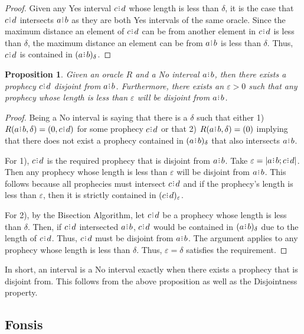 \documentclass[12pt]{article}
\newtheorem{proposition}{Proposition}[section]
\begin{document}
\begin{proof}
    Given any Yes interval $c\rint d$ whose length is less than $\delta$, it is the case that $c\rint d$ intersects $a\rint b$ as they are both Yes intervals of the same oracle. Since the maximum distance an element of $c\rint d$ can be from another element in $c\rint d$ is less than $\delta$, the maximum distance an element can be from $a\rint b$ is less than $\delta$. Thus, $c\rint d$ is contained in $\halo{a\rint b}$.
\end{proof}

\begin{proposition}\label{os-no-disjoint}
    Given an oracle $R$ and a No interval $a\rint b$, then there exists a prophecy $c\rint d$ disjoint from $a\rint b$. Furthermore, there exists an $\varepsilon > 0$ such that any prophecy whose length is less than $\varepsilon$ will be disjoint from $a\rint b$.
\end{proposition}

\begin{proof}
    Being a No interval is saying that there is a $\delta$ such that either 1) $R(a\rint b, \delta) = (0, c\rint d)$ for some prophecy $c\rint d$ or that 2) $R(a\rint b, \delta) = (0)$ implying that there does not exist a prophecy contained in $\halo{a\rint b}$ that also intersects $a\rint b$. 
    
    For 1), $c\rint d$ is the required prophecy that is disjoint from $a\rint b$. Take $\varepsilon = |a\rint b; c\rint d|$. Then any prophecy whose length is less than $\varepsilon$ will be disjoint from $a\rint b$. This follows because all prophecies must intersect $c\rint d$ and if the prophecy's length is less than $\varepsilon$, then it is strictly contained in $\halo[\varepsilon]{c\rint d}$.
    
    For 2), by the Bisection Algorithm, let $c\rint d$ be a prophecy whose length is less than $\delta$. Then, if $c\rint d$ intersected $a\rint b$, $c\rint d$ would be contained in $\halo{a\rint b}$ due to the length of $c\rint d$. Thus, $c\rint d$ must be disjoint from $a\rint b$. The argument applies to any prophecy whose length is less than $\delta$. Thus, $\varepsilon = \delta$ satisfies the requirement. 
\end{proof}

In short, an interval is a No interval exactly when there exists a prophecy that is disjoint from. This follows from the above proposition as well as the Disjointness property. 

\subsection{Fonsis}\label{os-fonsis}
\end{document}
